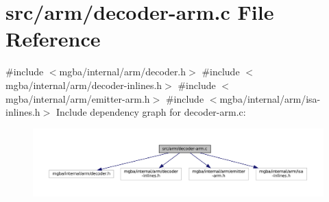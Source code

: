 \hypertarget{decoder-arm_8c}{}\section{src/arm/decoder-\/arm.c File Reference}
\label{decoder-arm_8c}
{\ttfamily \#include $<$mgba/internal/arm/decoder.\+h$>$}\newline
{\ttfamily \#include $<$mgba/internal/arm/decoder-\/inlines.\+h$>$}\newline
{\ttfamily \#include $<$mgba/internal/arm/emitter-\/arm.\+h$>$}\newline
{\ttfamily \#include $<$mgba/internal/arm/isa-\/inlines.\+h$>$}\newline
Include dependency graph for decoder-\/arm.c\+:
\nopagebreak
\begin{figure}[H]
\begin{center}
\leavevmode
\includegraphics[width=350pt]{decoder-arm_8c__incl}
\end{center}
\end{figure}
